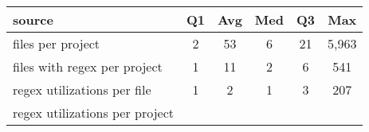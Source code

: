 \begin{center}
\begin{tabular}{l|ccccc}
\toprule
source & Q1 & Avg & Med & Q3 & Max \\ 
\midrule
files per project & 2 & 53 & 6 & 21 & 5,963 \\ 
\midrule
files with regex per project & 1 & 11 & 2 & 6 & 541 \\ 
\midrule
regex utilizations per file & 1 & 2 & 1 & 3 & 207 \\ 
\midrule
regex utilizations per project &  &  &  &  &  \\ 
\bottomrule
\end{tabular}
\end{center}
